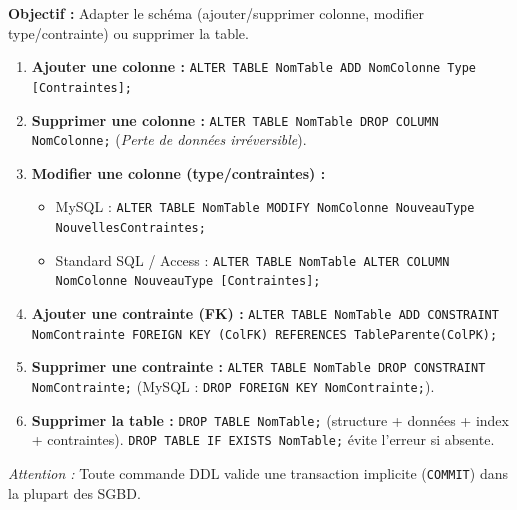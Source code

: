 \documentclass[11pt]{article}
\begin{document}
\begin{methode}
\textbf{Objectif :} Adapter le schéma (ajouter/supprimer colonne, modifier type/contrainte) ou supprimer la table.
\begin{enumerate}
    \item \textbf{Ajouter une colonne :} \texttt{ALTER TABLE NomTable ADD NomColonne Type [Contraintes];}
    \item \textbf{Supprimer une colonne :} \texttt{ALTER TABLE NomTable DROP COLUMN NomColonne;} (\emph{Perte de données irréversible}).
    \item \textbf{Modifier une colonne (type/contraintes) :}
    \begin{itemize}
        \item MySQL : \texttt{ALTER TABLE NomTable MODIFY NomColonne NouveauType NouvellesContraintes;}
        \item Standard SQL / Access : \texttt{ALTER TABLE NomTable ALTER COLUMN NomColonne NouveauType [Contraintes];}
    \end{itemize}
    \item \textbf{Ajouter une contrainte (FK) :} \texttt{ALTER TABLE NomTable ADD CONSTRAINT NomContrainte FOREIGN KEY (ColFK) REFERENCES TableParente(ColPK);}
    \item \textbf{Supprimer une contrainte :} \texttt{ALTER TABLE NomTable DROP CONSTRAINT NomContrainte;} (MySQL : \texttt{DROP FOREIGN KEY NomContrainte;}).
    \item \textbf{Supprimer la table :} \texttt{DROP TABLE NomTable;} (structure + données + index + contraintes). \texttt{DROP TABLE IF EXISTS NomTable;} évite l'erreur si absente.
\end{enumerate}
\emph{Attention :} Toute commande DDL valide une transaction implicite (\texttt{COMMIT}) dans la plupart des SGBD.
\end{methode}
\end{document}
